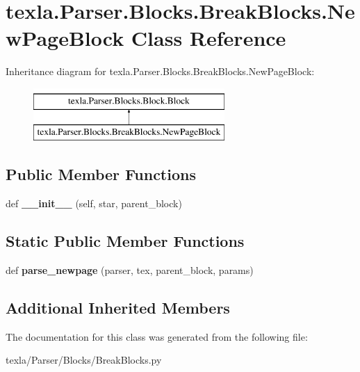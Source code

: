 \hypertarget{classtexla_1_1Parser_1_1Blocks_1_1BreakBlocks_1_1NewPageBlock}{}\section{texla.\+Parser.\+Blocks.\+Break\+Blocks.\+New\+Page\+Block Class Reference}
\label{classtexla_1_1Parser_1_1Blocks_1_1BreakBlocks_1_1NewPageBlock}
Inheritance diagram for texla.\+Parser.\+Blocks.\+Break\+Blocks.\+New\+Page\+Block\+:\begin{figure}[H]
\begin{center}
\leavevmode
\includegraphics[height=2.000000cm]{classtexla_1_1Parser_1_1Blocks_1_1BreakBlocks_1_1NewPageBlock}
\end{center}
\end{figure}
\subsection*{Public Member Functions}
\begin{DoxyCompactItemize}
\item 
\hypertarget{classtexla_1_1Parser_1_1Blocks_1_1BreakBlocks_1_1NewPageBlock_a633148dfeab769b07555cab8287f37e0}{}\label{classtexla_1_1Parser_1_1Blocks_1_1BreakBlocks_1_1NewPageBlock_a633148dfeab769b07555cab8287f37e0} 
def {\bfseries \+\_\+\+\_\+init\+\_\+\+\_\+} (self, star, parent\+\_\+block)
\end{DoxyCompactItemize}
\subsection*{Static Public Member Functions}
\begin{DoxyCompactItemize}
\item 
\hypertarget{classtexla_1_1Parser_1_1Blocks_1_1BreakBlocks_1_1NewPageBlock_ac4bd36c82dcc09def4bb12fe12766455}{}\label{classtexla_1_1Parser_1_1Blocks_1_1BreakBlocks_1_1NewPageBlock_ac4bd36c82dcc09def4bb12fe12766455} 
def {\bfseries parse\+\_\+newpage} (parser, tex, parent\+\_\+block, params)
\end{DoxyCompactItemize}
\subsection*{Additional Inherited Members}


The documentation for this class was generated from the following file\+:\begin{DoxyCompactItemize}
\item 
texla/\+Parser/\+Blocks/Break\+Blocks.\+py\end{DoxyCompactItemize}
